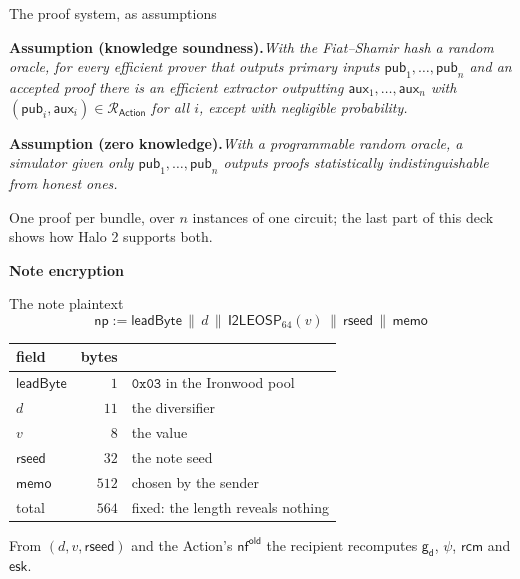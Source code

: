 \documentclass[aspectratio=169,11pt]{beamer}
\newcommand{\nfsym}{\ensuremath{\mathsf{nf}}}
\newcommand{\gd}{\ensuremath{\mathsf{g_d}}}
\newcommand{\rcm}{\ensuremath{\mathsf{rcm}}}
\newcommand{\esk}{\ensuremath{\mathsf{esk}}}
\newcommand{\divider}[1]{\begin{frame}[plain]\vfill\centering
  {\usebeamercolor[fg]{structure}\Huge\bfseries #1}\vfill\end{frame}}
\newcommand{\Ilep}[1]{\mathsf{I2LEOSP}_{#1}}
\newcommand{\old}{^{\mathsf{old}}}
\newcommand{\rseed}{\mathsf{rseed}}
\newcommand{\Rel}{\mathcal{R}}
\newcommand{\stmt}[2]{\par\smallskip\noindent\textbf{#1}\enspace\textit{#2}\par}
\begin{document}
\begin{frame}{The proof system, as assumptions}
\stmt{Assumption (knowledge soundness).}{With the Fiat--Shamir hash a random
oracle, for every efficient prover that outputs primary inputs
$\mathsf{pub}_1, \dots, \mathsf{pub}_n$ and an accepted proof there is an
efficient extractor outputting $\mathsf{aux}_1, \dots, \mathsf{aux}_n$
with $(\mathsf{pub}_i, \mathsf{aux}_i) \in \Rel_{\mathsf{Action}}$ for all
$i$, except with negligible probability.}
\vfill
\stmt{Assumption (zero knowledge).}{With a programmable random oracle, a
simulator given only $\mathsf{pub}_1, \dots, \mathsf{pub}_n$ outputs proofs
statistically indistinguishable from honest ones.}
\vfill
One proof per bundle, over $n$ instances of one circuit; the last part of
this deck shows how Halo 2 supports both.
\end{frame}

\divider{Note encryption}

\begin{frame}{The note plaintext}
\[
\mathsf{np} := \mathsf{leadByte} \,\|\, d \,\|\, \Ilep{64}(v) \,\|\, \rseed \,\|\, \mathsf{memo}
\]
\begin{center}
\begin{tabular}{@{}lrl@{}}
\toprule
field & bytes & \\
\midrule
$\mathsf{leadByte}$ & $1$ & $\mathtt{0x03}$ in the Ironwood pool \\
$d$ & $11$ & the diversifier \\
$v$ & $8$ & the value \\
$\rseed$ & $32$ & the note seed \\
$\mathsf{memo}$ & $512$ & chosen by the sender \\
\midrule
total & $564$ & fixed: the length reveals nothing \\
\bottomrule
\end{tabular}
\end{center}
\vfill
From $(d, v, \rseed)$ and the Action's $\nfsym\old$ the recipient recomputes
$\gd$, $\psi$, $\rcm$ and $\esk$.
\end{frame}
\end{document}
